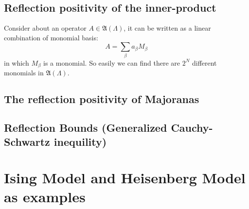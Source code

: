 \documentclass{article}
\begin{document}
\subsection{Reflection positivity of the inner-product}
Consider about an operator $A\in \mathfrak{A}(\Lambda)$, it can be written as a linear combination of monomial basis:
\begin{equation}
A = \sum_\beta a_\beta M_\beta
\end{equation}
in which $M_\beta$ is a monomial. So easily we can find there are $2^N$ different monomials in $\mathfrak{A}(\Lambda)$.

\subsection{The reflection positivity of Majoranas}

\subsection{Reflection Bounds (Generalized Cauchy-Schwartz inequility)}

\section{Ising Model and Heisenberg Model as examples}


\begin{thebibliography}{99}

\end{thebibliography}
\end{document}
